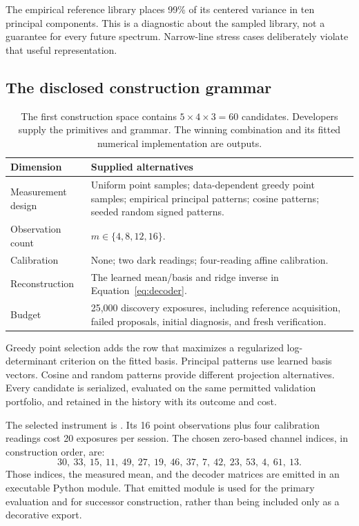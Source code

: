\documentclass[11pt,a4paper]{article}
\newcommand{\artifact}[1]{\texttt{\detokenize{#1}}}
\begin{document}
The empirical reference library places 99\% of its centered variance in ten principal components. This is a diagnostic about the sampled library, not a guarantee for every future spectrum. Narrow-line stress cases deliberately violate that useful representation.

\subsection{The disclosed construction grammar}

\begin{table}[htbp]
\centering
\begin{tabularx}{\textwidth}{@{}p{}X@{}}
\toprule
Dimension & Supplied alternatives\\
\midrule
Measurement design & Uniform point samples; data-dependent greedy point samples; empirical principal patterns; cosine patterns; seeded random signed patterns.\\
Observation count & \(m\in\{4,8,12,16\}\).\\
Calibration & None; two dark readings; four-reading affine calibration.\\
Reconstruction & The learned mean/basis and ridge inverse in Equation~\ref{eq:decoder}.\\
Budget & 25,000 discovery exposures, including reference acquisition, failed proposals, initial diagnosis, and fresh verification.\\
\bottomrule
\end{tabularx}
\caption{The first construction space contains \(5\times4\times3=60\) candidates. Developers supply the primitives and grammar. The winning combination and its fitted numerical implementation are outputs.}
\label{tab:grammar}
\end{table}

Greedy point selection adds the row that maximizes a regularized log-determinant criterion on the fitted basis. Principal patterns use learned basis vectors. Cosine and random patterns provide different projection alternatives. Every candidate is serialized, evaluated on the same permitted validation portfolio, and retained in the history with its outcome and cost.

The selected instrument is \artifact{greedy_points-16-affine}. Its 16 point observations plus four calibration readings cost 20 exposures per session. The chosen zero-based channel indices, in construction order, are:
\[
30,\ 33,\ 15,\ 11,\ 49,\ 27,\ 19,\ 46,\ 37,\ 7,\ 42,\ 23,\ 53,\ 4,\ 61,\ 13.
\]
Those indices, the measured mean, and the decoder matrices are emitted in an executable Python module. That emitted module is used for the primary evaluation and for successor construction, rather than being included only as a decorative export.
\end{document}
